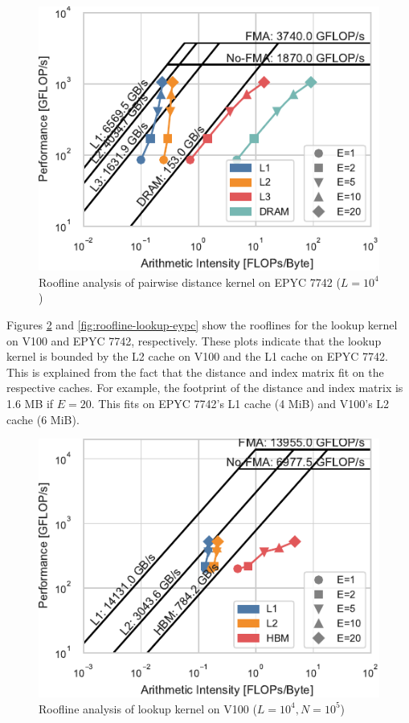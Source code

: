 \documentclass[sigconf]{acmart}
\begin{document}
\begin{figure}
    \centering
    \includegraphics{figs/roofline_distances_epyc}
    \caption{Roofline analysis of pairwise distance kernel on EPYC 7742 ($L=10^4$)}%
    \label{fig:roofline-distances-epyc}
\end{figure}

Figures \ref{fig:roofline-lookup-v100} and \ref{fig:roofline-lookup-eypc} show
the rooflines for the lookup kernel on V100 and EPYC 7742, respectively. These
plots indicate that the lookup kernel is bounded by the L2 cache on V100 and
the L1 cache on EPYC 7742. This is explained from the fact that the distance
and index matrix fit on the respective caches. For example, the footprint of
the distance and index matrix is 1.6 MB if $E=20$. This fits on EPYC 7742's L1
cache (4 MiB) and V100's L2 cache (6 MiB).

\begin{figure}
    \centering
    \includegraphics{figs/roofline_lookup_wo_rho_v100}
    \caption{Roofline analysis of lookup kernel on V100 ($L=10^4, N=10^5$)}%
    \label{fig:roofline-lookup-v100}
\end{figure}
\end{document}
